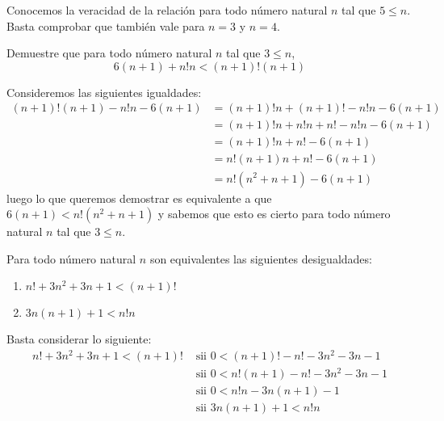 \begin{solution}
  Conocemos la veracidad de la relación para todo número natural $n$
  tal que $5\leq n$. Basta comprobar que también vale para $n=3$ y
  $n=4$.
\end{solution}

\begin{exercise}
  Demuestre que para todo número natural $n$ tal que $3\leq n$,
  \begin{equation*}
    6(n+1)+n!n<(n+1)!(n+1)
  \end{equation*}
\end{exercise}


\begin{solution}
  Consideremos las siguientes igualdades:
  \begin{align*}
    (n+1)!(n+1)-n!n-6(n+1)&=(n+1)!n+(n+1)!-n!n-6(n+1)\\
                          &=(n+1)!n+n!n+n!-n!n-6(n+1)\\
                          &=(n+1)!n+n!-6(n+1)\\
                          &=n!(n+1)n+n!-6(n+1)\\
                          &=n!(n^{2}+n+1)-6(n+1)
  \end{align*}
  luego lo que queremos demostrar es equivalente a que
  $6(n+1)<n!(n^{2}+n+1)$ y sabemos que esto es cierto para todo número
  natural $n$ tal que $3\leq n$.
\end{solution}

\begin{exercise}
  Para todo número natural $n$ son equivalentes las siguientes
  desigualdades:
  \begin{enumerate}
  \item $n!+3n^{2}+3n+1<(n+1)!$
  \item $3n(n+1)+1<n!n$
  \end{enumerate}
\end{exercise}

\begin{solution}
  Basta considerar lo siguiente:
  \begin{align*}
    n!+3n^{2}+3n+1<(n+1)!&\text{ sii } 0<(n+1)!-n!-3n^{2}-3n-1\\
                         &\text{ sii } 0<n!(n+1)-n!-3n^{2}-3n-1\\
                         &\text{ sii } 0<n!n-3n(n+1)-1\\
                           &\text{ sii } 3n(n+1)+1<n!n
  \end{align*}
\end{solution}

